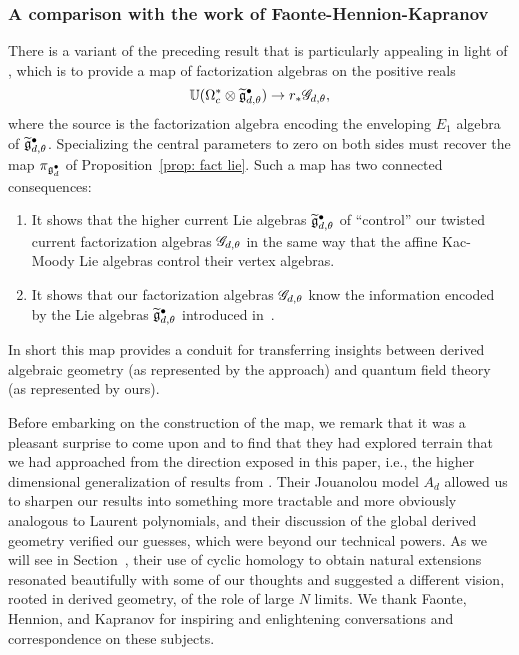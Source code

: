 \subsubsection{A comparison with the work of Faonte-Hennion-Kapranov}

There is a variant of the preceding result that is particularly appealing in light of \cite{FHK},
which is to provide a map of factorization algebras on the positive reals
\[
\mathbb U(\Omega^*_c \otimes \widetilde{\mathfrak g}^\bullet_{d,\theta}) \to r_* \mathscr G_{d,\theta},
\] 
where the source is the factorization algebra encoding the enveloping $E_1$ algebra of $\widetilde{\mathfrak g}^\bullet_{d,\theta}$.
Specializing the central parameters to zero on both sides must recover the map $\pi_{\mathfrak g^\bullet_d}$ of Proposition~\ref{prop: fact lie}.
Such a map has two connected consequences:
\begin{enumerate}
\item It shows that the higher current Lie algebras $\widetilde{\mathfrak g}^\bullet_{d,\theta}$ of \cite{FHK} ``control'' our twisted current factorization algebras $\mathscr G_{d,\theta}$ in the same way that the affine Kac-Moody Lie algebras control their vertex algebras.
\item It shows that our factorization algebras $\mathscr G_{d,\theta}$ know the information encoded by the Lie algebras $\widetilde{\mathfrak g}^\bullet_{d,\theta}$ introduced in~\cite{FHK}.
\end{enumerate}
In short this map provides a conduit for transferring insights between derived algebraic geometry (as represented by the \cite{FHK} approach) and quantum field theory (as represented by ours).


\begin{rmk}
Before embarking on the construction of the map,
we remark that it was a pleasant surprise to come upon \cite{FHK} 
and to find that they had explored terrain that we had approached from the direction exposed in this paper,
i.e., the higher dimensional generalization of results from \cite{CG1}.
Their Jouanolou model $A_d$ allowed us to sharpen our results into something more tractable and more obviously analogous to Laurent polynomials,
and their discussion of the global derived geometry verified our guesses, 
which were beyond our technical powers.
As we will see in Section~,
their use of cyclic homology to obtain natural extensions resonated beautifully with some of our thoughts 
and suggested a different vision, rooted in derived geometry, of the role of large $N$ limits.
We thank Faonte, Hennion, and Kapranov for inspiring and enlightening conversations and correspondence on these subjects.
\end{rmk}

